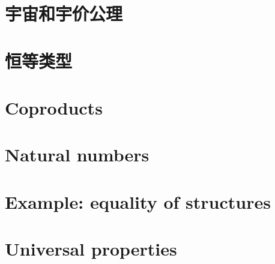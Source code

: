\section{宇宙和宇价公理}
\label{sec:compute-universe}


\section{恒等类型}
\label{sec:compute-paths}


\section{Coproducts}
\label{sec:compute-coprod}


\section{Natural numbers}
\label{sec:compute-nat}


\section{Example: equality of structures}
\label{sec:equality-of-structures}


\section{Universal properties}
\label{sec:universal-properties}





